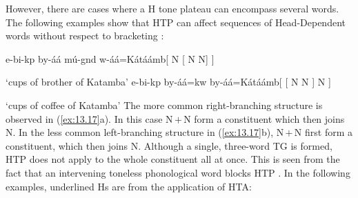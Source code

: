 \documentclass[output=paper]{langsci/langscibook}
\begin{document}
However, there are cases where a H tone plateau can encompass several words.
The following examples show that \gls{HTP} can affect sequences of Head-Dependent
words without respect to bracketing \citep[159]{Hyman1988}:

\ea\label{ex:13.17}
    \ea e-bi-kp  by-áá  mú-gnd
    w-áá=Kátáámb\hfill[ N [ N N] ]
    \\\vspace{1\baselineskip}
        ‘cups of brother of Katamba’
        \ex e-bi-kp  by-áá=kw by-áá=Kátáámb\hfill[ [ N N ] N ]\\\vspace{1\baselineskip}
        ‘cups of coffee of Katamba’
    \z
\z
The more common right-branching structure is observed in (\ref{ex:13.17}a). In
this case N\,$+$\,N form a constituent which then joins N.
In the less common left-bran\-ch\-ing structure in (\ref{ex:13.17}b),
N\,$+$\,N first form a constituent, which then joins N.
Although a single, three-word \gls{TG} is formed, \gls{HTP} does not
apply to the whole constituent all at once. This is seen from the fact that an
intervening toneless phonological word blocks \gls{HTP} \citep[157]{Hyman1988}.
In the following examples, underlined Hs are from the application of \gls{HTA}:
\end{document}
